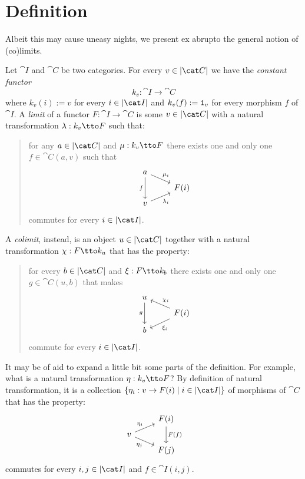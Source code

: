 
\section{Definition}

Albeit this may cause uneasy nights, we present ex abrupto the general notion of (co)limits.

\begin{definition}
Let \(\cat I\) and \(\cat C\) be two categories. For every \(v \in \obj{\cat C}\) we have the {\em constant functor}
\[k_v : \cat I \to \cat C\]
where \(k_v(i) := v\) for every \(i \in \obj{\cat I}\) and \(k_v(f) := \mathtt 1_v\) for every morphism \(f\) of \(\cat I\). A {\em limit} of a functor \(F : \cat I \to \cat C\) is some \(v \in \obj{\cat C}\) with a natural transformation \(\lambda : k_v \tto F\)
such that:
\begin{quotation}
for any \(a \in \obj{\cat C}\) and \(\mu : k_v \tto F\)
there exists one and only one \(f \in \cat C(a, v)\) such that
\[\begin{tikzcd}[row sep=tiny]
a \ar["{\mu_i}", dr] \ar["f", dd, swap] \\
& F(i) \\
v \ar["{\lambda_i}", ur, swap]
\end{tikzcd}\]
commutes for every \(i \in \obj{\cat I}\).
\end{quotation}
A {\em colimit}, instead, is an object \(u \in \obj{\cat C}\) together with a natural transformation \(\chi : F \tto k_u\) that has the property:
\begin{quotation}
for every \(b \in \obj{\cat C}\) and \(\xi : F \tto k_b\) there exists one and only one \(g \in \cat C(u, b)\) that makes
\[\begin{tikzcd}[row sep=tiny]
u  \ar["g", dd, swap] \\
& F(i) \ar["{\chi_i}", ul, swap] \ar["{\xi_i}", dl]\\
b
\end{tikzcd}\]
commute for every \(i \in \obj{\cat I}\).
\end{quotation}
\end{definition}

It may be of aid to expand a little bit some parts of the definition. For example, what is a natural transformation \(\eta : k_v \tto F\)? By definition of natural transformation, it is a collection \(\set{\eta_i : v \to F(i) \mid i \in \obj{\cat I}}\) of morphisms of \(\cat C\) that has the property:
\[\begin{tikzcd}[row sep=tiny]
& F(i) \ar["{F(f)}", dd] \\
v \ar["{\eta_i}", ur] \ar["{\eta_j}", dr, swap] \\
& F(j)
\end{tikzcd}\]
commutes for every \(i, j \in \obj{\cat I}\) and \(f \in \cat I (i, j)\).

